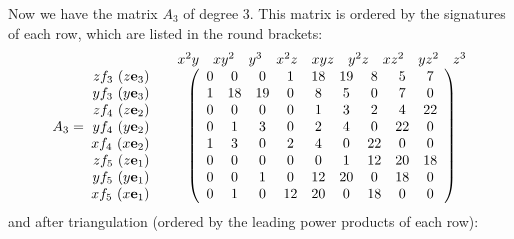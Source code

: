 \documentclass[preprint,authoryear,3p,12pt]{elsarticle}
\def\eb{{\bf e}}
\begin{document}
Now we have the matrix $A_3$ of degree $3$. This matrix is ordered
by the signatures of each row, which are listed in the round
brackets:
\[
\begin{array}{cc} & \begin{array}{cccccccccc}
x^2y & xy^2 & y^3 & x^2z & xyz & y^2z & xz^2 & yz^2 & z^3
\end{array}\\
\begin{array}{r}
zf_3\ (z\eb_3)\\ yf_3\ (y\eb_3)\\ zf_4\ (z\eb_2)\\ A_3=\ yf_4\
(y\eb_2)\\ xf_4\ (x\eb_2)\\ zf_5\ (z\eb_1)
\\ yf_5\ (y\eb_1)\\ xf_5\ (x\eb_1)
\end{array} &
\left(
\begin{array}{cccccccccc}
0 & 0 & 0 & 1 & 18 & 19 & 8 & 5 & 7\\
1 & 18 & 19 & 0 & 8 & 5 & 0 & 7 & 0\\
0 & 0 & 0 & 0 & 1 & 3 & 2 & 4 & 22\\
0 & 1 & 3 & 0 & 2 & 4 & 0 & 22 & 0\\
1 & 3 & 0 & 2 & 4 & 0 & 22 & 0 & 0\\
0 & 0 & 0 & 0 & 0 & 1 & 12 & 20 & 18\\
0 & 0 & 1 & 0 & 12 & 20 & 0 & 18 & 0\\
0 & 1 & 0 & 12 & 20 & 0 & 18 & 0 & 0
\end{array}
\right)
\end{array}
\]
and after triangulation (ordered by the leading power products of
each row):
\end{document}
